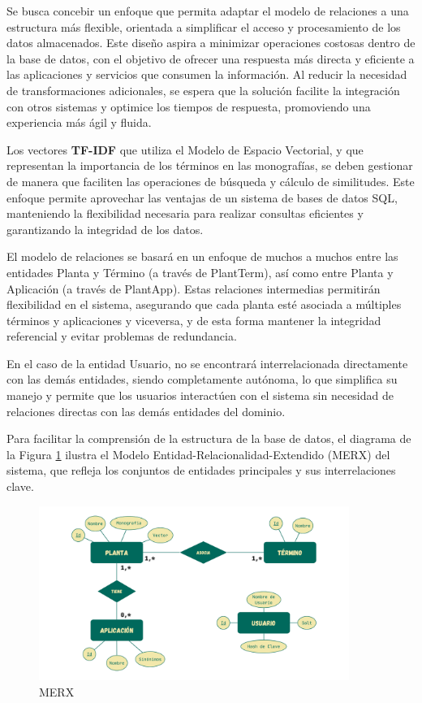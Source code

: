 Se busca concebir un enfoque que permita adaptar el modelo de relaciones a una estructura más flexible, orientada a simplificar el acceso y procesamiento de los datos almacenados. 
Este diseño aspira a minimizar operaciones costosas dentro de la base de datos, con el objetivo de ofrecer una respuesta más directa y eficiente a las aplicaciones y servicios que 
consumen la información. Al reducir la necesidad de transformaciones adicionales, se espera que la solución facilite la integración con otros sistemas y optimice los tiempos de respuesta, 
promoviendo una experiencia más ágil y fluida.

Los vectores \textbf{TF-IDF} que utiliza el Modelo de Espacio Vectorial, y que representan la importancia de los términos en las monografías, se deben gestionar de manera que 
faciliten las operaciones de búsqueda y cálculo de similitudes. Este enfoque permite aprovechar las ventajas de un sistema de bases de datos SQL, manteniendo la flexibilidad necesaria 
para realizar consultas eficientes y garantizando la integridad de los datos.

El modelo de relaciones se basará en un enfoque de muchos a muchos entre las entidades Planta y Término (a través de PlantTerm), así como entre Planta y Aplicación (a través de PlantApp). 
Estas relaciones intermedias permitirán flexibilidad en el sistema, asegurando que cada planta esté asociada a múltiples términos y aplicaciones y viceversa, y de esta forma mantener la integridad 
referencial y evitar problemas de redundancia. 

En el caso de la entidad Usuario, no se encontrará interrelacionada directamente con las demás entidades, siendo completamente autónoma, lo que simplifica su manejo y permite 
que los usuarios interactúen con el sistema sin necesidad de relaciones directas con las demás entidades del dominio.

Para facilitar la comprensión de la estructura de la base de datos, el diagrama de la Figura \ref{fig:merx} ilustra el Modelo Entidad-Relacionalidad-Extendido (MERX) del sistema, que refleja los conjuntos 
de entidades principales y sus interrelaciones clave.

\newpage
\begin{figure}[ht!]
    \centering
    \includegraphics[width=0.9\textwidth]{Images/merx_es.png}
    \caption{MERX}
    \label{fig:merx}
\end{figure}

